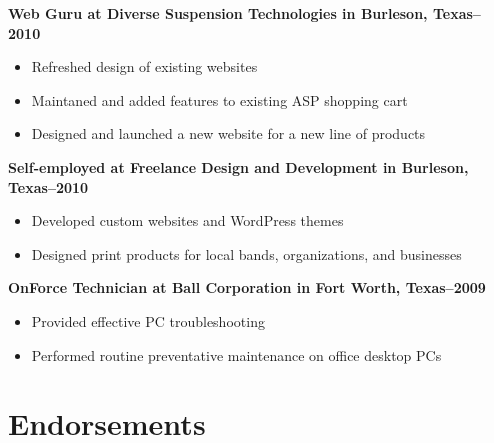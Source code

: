\documentclass[margin]{res}
\newcommand{\sectionspace}{\vspace{10pt}}
\begin{document}
\begin{resume}
                \textbf{Web Guru
                 at Diverse Suspension Technologies in Burleson, Texas--2010}
                 \vspace{-10pt}\begin{itemize} \itemsep -2pt %
                   \item Refreshed design of existing websites
                 
                   \item Maintaned and added features to existing ASP shopping cart
                 
                   \item Designed and launched a new website for a new line of products
                 \end{itemize}
              
                \textbf{Self-employed
                 at Freelance Design and Development in Burleson, Texas--2010}
                 \vspace{-10pt}\begin{itemize} \itemsep -2pt %
                   \item Developed custom websites and WordPress themes
                 
                   \item Designed print products for local bands, organizations, and businesses
                 \end{itemize}
              
                \textbf{OnForce Technician
                 at Ball Corporation in Fort Worth, Texas--2009}
                 \vspace{-10pt}\begin{itemize} \itemsep -2pt %
                   \item Provided effective PC troubleshooting
                 
                   \item Performed routine preventative maintenance on office desktop PCs
                 \end{itemize}
              

\sectionspace


\section{
Endorsements}


\end{resume}
\end{document}
